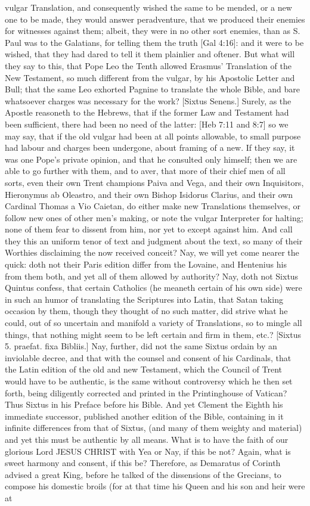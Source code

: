 {vulgar Translation, and consequently wished the same to be mended, or a new one to be made, they would answer peradventure, that we produced their enemies for witnesses against them; albeit, they were in no other sort enemies, than as S. Paul was to the Galatians, for telling them the truth [Gal 4:16]: and it were to be wished, that they had dared to tell it them plainlier and oftener. But what will they say to this, that Pope Leo the Tenth allowed Erasmus’ Translation of the New Testament, so much different from the vulgar, by his Apostolic Letter and Bull; that the same Leo exhorted Pagnine to translate the whole Bible, and bare whatsoever charges was necessary for the work? [Sixtus Senens.] Surely, as the Apostle reasoneth to the Hebrews, that if the former Law and Testament had been sufficient, there had been no need of the latter: [Heb 7:11 and 8:7] so we may say, that if the old vulgar had been at all points allowable, to small purpose had labour and charges been undergone, about framing of a new. If they say, it was one Pope’s private opinion, and that he consulted only himself; then we are able to go further with them, and to aver, that more of their chief men of all sorts, even their own Trent champions Paiva and Vega, and their own Inquisitors, Hieronymus ab Oleastro, and their own Bishop Isidorus Clarius, and their own Cardinal Thomas a Vio Caietan, do either make new Translations themselves, or follow new ones of other men’s making, or note the vulgar Interpreter for halting; none of them fear to dissent from him, nor yet to except against him. And call they this an uniform tenor of text and judgment about the text, so many of their Worthies disclaiming the now received conceit? Nay, we will yet come nearer the quick: doth not their Paris edition differ from the Lovaine, and Hentenius his from them both, and yet all of them allowed by authority? Nay, doth not Sixtus Quintus confess, that certain Catholics (he meaneth certain of his own side) were in such an humor of translating the Scriptures into Latin, that Satan taking occasion by them, though they thought of no such matter, did strive what he could, out of so uncertain and manifold a variety of Translations, so to mingle all things, that nothing might seem to be left certain and firm in them, etc.? [Sixtus 5. praefat. fixa Bibliis.] Nay, further, did not the same Sixtus ordain by an inviolable decree, and that with the counsel and consent of his Cardinals, that the Latin edition of the old and new Testament, which the Council of Trent would have to be authentic, is the same without controversy which he then set forth, being diligently corrected and printed in the Printinghouse of Vatican? Thus Sixtus in his Preface before his Bible. And yet Clement the Eighth his immediate successor, published another edition of the Bible, containing in it infinite differences from that of Sixtus, (and many of them weighty and material) and yet this must be authentic by all means. What is to have the faith of our glorious Lord JESUS CHRIST with Yea or Nay, if this be not? Again, what is sweet harmony and consent, if this be? Therefore, as Demaratus of Corinth advised a great King, before he talked of the dissensions of the Grecians, to compose his domestic broils (for at that time his Queen and his son and heir were at }
